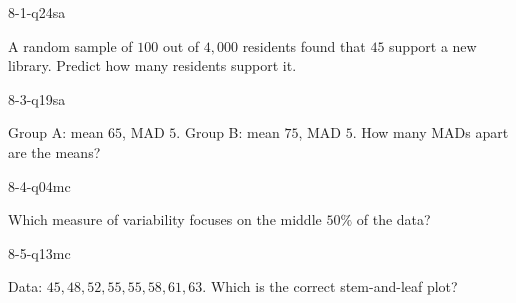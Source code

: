 \begin{practiceQuestion}{8-1-q24}{sa}
\begin{questionText}
A random sample of $100$ out of $4{,}000$ residents found that $45$ support a new library. Predict how many residents support it.
\end{questionText}
\end{practiceQuestion}

\begin{practiceQuestion}{8-3-q19}{sa}
\begin{questionText}
Group A: mean $65$, MAD $5$. Group B: mean $75$, MAD $5$. How many MADs apart are the means?
\end{questionText}
\end{practiceQuestion}

\begin{practiceQuestion}{8-4-q04}{mc}
\begin{questionText}
Which measure of variability focuses on the middle $50\%$ of the data?
\end{questionText}
\end{practiceQuestion}

\begin{practiceQuestion}{8-5-q13}{mc}
\begin{questionText}
Data: $45, 48, 52, 55, 55, 58, 61, 63$. Which is the correct stem-and-leaf plot?
\end{questionText}
\end{practiceQuestion}

